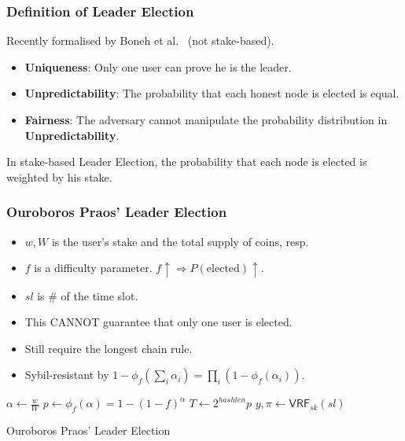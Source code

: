 \documentclass{beamer}
\begin{document}
\begin{frame}
\frametitle{Definition of Leader Election}


Recently formalised by Boneh et al.~\cite{bonehsingle} (not stake-based).

\begin{itemize}
    \item \textbf{Uniqueness}: Only one user can prove he is the leader.
    \item \textbf{Unpredictability}: The probability that each honest node is elected is equal.
    \item \textbf{Fairness}: The adversary cannot manipulate the probability distribution in \textbf{Unpredictability}.
\end{itemize}

In stake-based Leader Election, the probability that each node is elected is weighted by his stake.

\end{frame}





\begin{frame}
\frametitle{Ouroboros Praos' Leader Election}

\begin{itemize}
    \item $w, W$ is the user's stake and the total supply of coins, resp.
    \item $f$ is a difficulty parameter. $f \uparrow \Rightarrow P(\text{elected}) \uparrow$.
    \item $sl$ is \# of the time slot.
    \item This CANNOT guarantee that only one user is elected.
    \item Still require the longest chain rule.
    \item Sybil-resistant by $1 - \phi_f(\sum_i \alpha_i) = \prod_i(1 - \phi_f(\alpha_i))$.
\end{itemize}

\begin{algorithm}[H]
    \DontPrintSemicolon
    $\alpha \gets \frac{w}{W}$\;
    $p \gets \phi_f(\alpha) = 1 - (1-f)^\alpha$\;
    $T \gets 2^{hashlen} p$\;
    $y, \pi \gets \mathsf{VRF}_{sk}(sl)$\;
     {
        \;
    }
    \caption{Ouroboros Praos' Leader Election}
\end{algorithm}


\end{frame}
\end{document}
